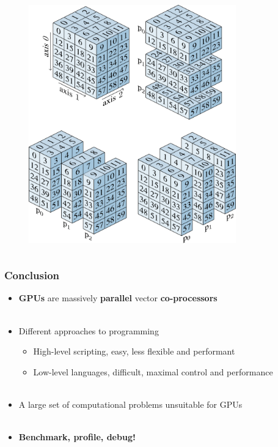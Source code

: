 \documentclass[aspectratio=1610]{beamer}
\begin{document}
\begin{frame}
\begin{columns}
\begin{column}{0.38\textwidth}
\begin{figure}
            \end{figure}
            \begin{figure}
                \centering
                \includegraphics[width=0.8\textwidth]{images/all-splits.png}
            \end{figure}
        \end{column}
    \end{columns}
\end{frame}

\begin{frame}
    \frametitle{Conclusion}
    
    \begin{itemize}
        \item \textbf{GPUs} are massively \textbf{parallel} vector \textbf{co-processors}\\~
        \item Different approaches to programming
        \begin{itemize}
            \item High-level scripting, easy, less flexible and performant
            \item Low-level languages, difficult, maximal control and performance\\~
        \end{itemize}
        \item A large set of computational problems unsuitable for GPUs\\~
        \item \textbf{Benchmark, profile, debug!}
    \end{itemize}
\end{frame}
\end{document}
